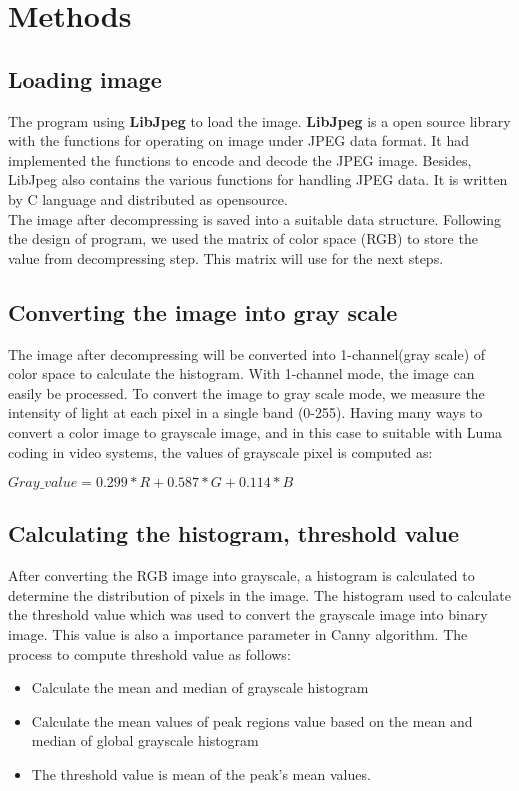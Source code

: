 \documentclass[12pt, a4paper]{article}
\begin{document}
\section{Methods}
\subsection{Loading image}
The program using \textbf{LibJpeg} to load the image. \textbf{LibJpeg} is a open source library with the functions for operating on image under JPEG data format. It had implemented the functions to encode and decode the JPEG image. Besides, LibJpeg also contains the various functions for handling JPEG data. It is written by C language and distributed as opensource.\\[0.cm]
The image after decompressing is saved into a suitable data structure. Following the design of program, we used the matrix of color space (RGB) to store the value from decompressing step. This matrix will use for the next steps.
\subsection{Converting the image into gray scale }
The image after decompressing will be converted into 1-channel(gray scale) of color space to calculate the histogram. With 1-channel mode, the image can easily be processed. To convert the image to gray scale mode, we measure the intensity of light at each pixel in a single band (0-255). Having many ways to convert a color image to grayscale image, and in this case to suitable with Luma coding in video systems, the values of grayscale pixel is computed as: 
\begin{center}
$Gray\_value = 0.299*R + 0.587*G + 0.114*B$
\end{center}
\subsection{Calculating the histogram, threshold value}
After converting the RGB image into grayscale, a histogram is calculated to determine the distribution of pixels in the image. The histogram used to calculate the threshold value which was used to convert the grayscale image into binary image. This value is also a importance parameter in Canny algorithm. The process to compute threshold value as follows:
\begin{itemize}
	\item Calculate the mean and median of grayscale histogram
	\item Calculate the mean values of peak regions value based on the mean and median of global grayscale histogram
	\item The threshold value is mean of the peak's mean values.
\end{itemize}
\end{document}
